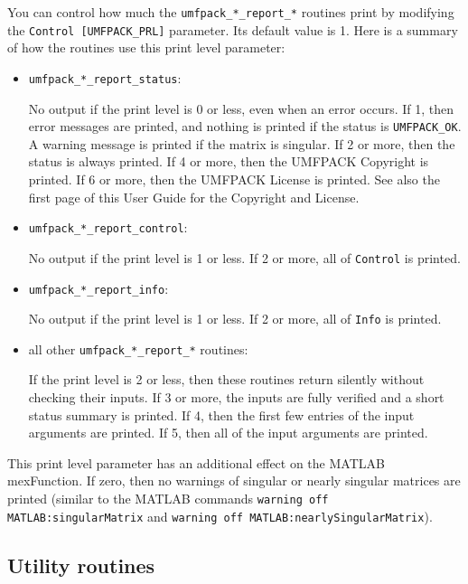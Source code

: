 \documentclass[11pt]{article}
\begin{document}
You can control how much the {\tt umfpack\_*\_report\_*} routines print by
modifying the {\tt Control [UMFPACK\_PRL]} parameter.  Its default value is 1.
Here is a summary of how the routines use this print level parameter:

\begin{itemize}
\item {\tt umfpack\_*\_report\_status}:

    No output if the print level is 0 or less, even when an error occurs.
    If 1, then error messages are printed, and nothing is printed if
    the status is {\tt UMFPACK\_OK}.  A warning message is printed if
    the matrix is singular.  If 2 or more, then the status is always
    printed.  If 4 or more, then the UMFPACK Copyright is printed.
    If 6 or more, then the UMFPACK License is printed.  See also the first page
    of this User Guide for the Copyright and License.

\item {\tt umfpack\_*\_report\_control}:

    No output if the print level is 1 or less.  If 2 or more, all of
    {\tt Control} is printed.

\item {\tt umfpack\_*\_report\_info}:

    No output if the print level is 1 or less.  If 2 or more, all of
    {\tt Info} is printed.

\item all other {\tt umfpack\_*\_report\_*} routines:

    If the print level is 2 or less, then these routines return silently without
    checking their inputs.  If 3 or more, the inputs are fully verified and a
    short status summary is printed.  If 4, then the first few entries of the
    input arguments are printed.  If 5, then all of the input arguments are
    printed.

\end{itemize}

This print level parameter has an additional effect on the MATLAB mexFunction.
If zero, then no warnings of singular or nearly singular matrices are
printed (similar to the MATLAB commands
{\tt warning off MATLAB:singularMatrix} and
{\tt warning off MATLAB:nearlySingularMatrix}).

\subsection{Utility routines}
\end{document}
